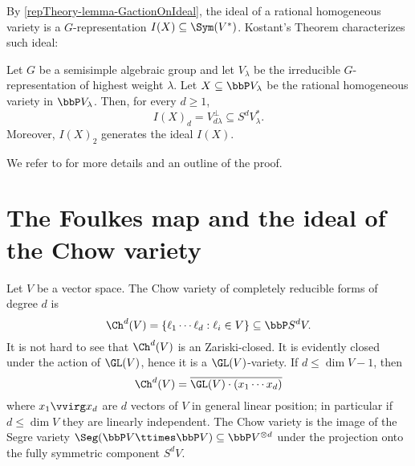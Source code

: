 By \ref{repTheory-lemma-GactionOnIdeal}, the ideal of a rational homogeneous variety is a $G$-representation $I(X) \subseteq \Sym( V^*)$. Kostant's Theorem characterizes such ideal:
\begin{theorem}
 \label{reptheory-theorem-kostant}
Let $G$ be a semisimple algebraic group and let $V_\lambda$ be the irreducible $G$-representation of highest weight $\lambda$. Let $X \subseteq \bbP V_\lambda$ be the rational homogeneous variety in $\bbP V_\lambda$. Then, for every $d \geq 1$, 
\[
I(X)_d = V_{d\lambda}^\perp \subseteq S^d V_\lambda^*.
\]
Moreover, $I(X)_2$ generates the ideal $I(X)$.
\end{theorem}
We refer to \cite[Ch.16]{Lan12} for more details and an outline of the proof.

\section{The Foulkes map and the ideal of the Chow variety}
\label{RepTheory-section-foulkes}

Let $V$ be a vector space. The Chow variety of completely reducible forms of degree $d$ is 
\[
\Ch^{d}(V) = \{ \ell_1 \cdots \ell_d : \ell_i \in V \} \subseteq \bbP S^d V.
\]
It is not hard to see that $\Ch^d(V)$ is an Zariski-closed. It is evidently closed under the action of $\GL(V)$, hence it is a $\GL(V)$-variety. If $d \leq \dim V -1$, then 
\[
\Ch^d(V) = \overline{\GL(V) \cdot (x_1 \cdots x_d)}
\]
where $x_1 \vvirg x_d$ are $d$ vectors of $V$ in general linear position; in particular if $d\leq \dim V$ they are linearly independent. The Chow variety is the image of the Segre variety $\Seg(\bbP V \ttimes \bbP V) \subseteq \bbP V^{\otimes d}$ under the projection onto the fully symmetric component $S^d V$.

